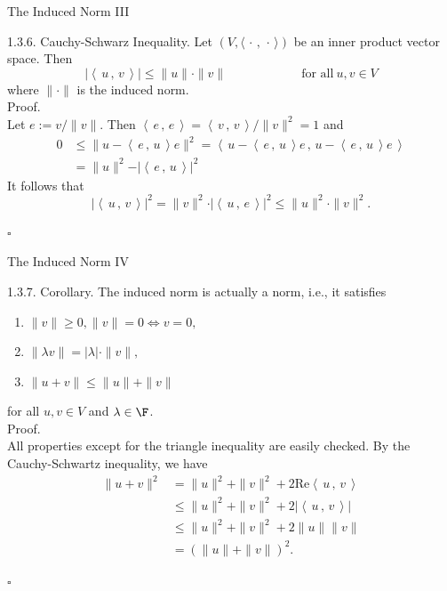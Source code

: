 \documentclass[smaller,hyperref={CJKbookmarks=true}]{beamer}
\newcommand{\scp}[2]{\left\langle\,#1\,,\,#2\,\right\rangle} \newcommand{\scpp}{\langle\,\cdot\,,\,\cdot\,\rangle}
\begin{document}
\begin{frame}[t,shrink]{The Induced Norm III} \begin{spacing}{0.9}
\alert{1.3.6. Cauchy-Schwarz Inequality.} Let $(V,\scpp)$ be an inner product vector space. Then
\[\vert\scp{u}{v}\vert\leq\|u\|\cdot\|v\|\qquad\qquad\qquad\text{for all}~u,v\in V\]
where $\|\cdot\|$ is the induced norm.\\[11pt]
\alert{Proof.}\\
Let $e:=v/\|v\|.$ Then $\scp{e}{e}=\scp{v}{v}/\|v\|^2=1$ and
\begin{align*}
  0 & \leq\|u-\scp{e}{u}e\|^2=\scp{u-\scp{e}{u}e}{u-\scp{e}{u}e} \\
    &=\|u\|^2-\vert\scp{e}{u}\vert^2
\end{align*}
It follows that
\[\vert\scp{u}{v}\vert^2=\|v\|^2\cdot\vert\scp{u}{e}\vert^2\leq\|u\|^2\cdot\|v\|^2.\]
\begin{flushright}
  $\square$
\end{flushright}
\end{spacing}
\end{frame}
\begin{frame}[t,shrink]{The Induced Norm IV}
\begin{spacing}{1}
\alert{1.3.7. Corollary.} The induced norm is actually a norm, i.e., it satisfies
\begin{enumerate}[1.]
  \item \(\|v\|\geq0,\|v\|=0 \Leftrightarrow v=0,\)
  \item \(\|\lambda v\|=|\lambda|\cdot\|v\|,\)
  \item \(\|u+v\|\leq\|u\|+\|v\|\)
\end{enumerate}
for all $u,v\in V$ and $\lambda\in\F$.\\
\alert{Proof.}\\
All properties except for the triangle inequality are easily checked. By the Cauchy-Schwartz inequality, we have
\begin{align*}
  \|u+v\|^2 &=\|u\|^2+\|v\|^2+2\text{Re}\scp{u}{v} \\
   &\leq\|u\|^2+\|v\|^2+2|\scp{u}{v}|  \\
   &\leq\|u\|^2+\|v\|^2+2\|u\|\|v\|  \\
   &=(\|u\|+\|v\|)^2.
\end{align*}
\begin{flushright}
  $\square$
\end{flushright}
\end{spacing}
\end{frame}
\end{document}
